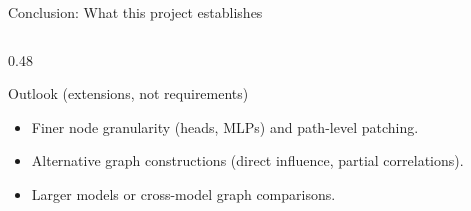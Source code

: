 \documentclass[aspectratio=169,xcolor={dvipsnames}]{beamer}
\begin{document}
\begin{frame}[shrink=20]{Conclusion: What this project establishes}
\begin{columns}[T,onlytextwidth]
\begin{column}{0.48\textwidth}
\begin{block}{Outlook (extensions, not requirements)}
\begin{itemize}\setlength\itemsep{2pt}
\item Finer node granularity (heads, MLPs) and path-level patching.
\item Alternative graph constructions (direct influence, partial correlations).
\item Larger models or cross-model graph comparisons.
\end{itemize}
\end{block}
\end{column}

\end{columns}
\end{frame}
\end{document}
